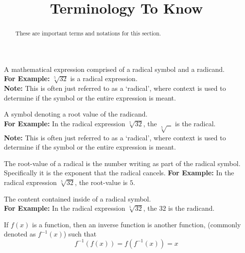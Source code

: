 \documentclass{ximeraXloud}
\title{Terminology To Know}
\begin{document}
\begin{abstract}
    These are important terms and notations for this section.
\end{abstract}
\maketitle

\begin{definition}
    A mathematical expression comprised of a radical symbol and a radicand. \\
    \textbf{For Example:} $\sqrt[5]{32}$ is a radical expression.\\
    \textbf{Note:} This is often just referred to as a `radical', where context is used to determine if the symbol or the entire expression is meant.
\end{definition} 

\begin{definition}
    A symbol denoting a root value of the radicand.\\
    \textbf{For Example:} In the radical expression $\sqrt[5]{32}$, the $\sqrt[5]{\text{     }}$ is the radical.\\
    \textbf{Note:} This is often just referred to as a `radical', where context is used to determine if the symbol or the entire expression is meant.
\end{definition} 

\begin{definition}
    The root-value of a radical is the number writing as part of the radical symbol. Specifically it is the exponent that the radical cancels.
    \textbf{For Example:} In the radical expression $\sqrt[5]{32}$, the root-value is $5$.
\end{definition} 

\begin{definition}[Radicand]
    The content contained inside of a radical symbol. \\
    \textbf{For Example:} In the radical expression $\sqrt[5]{32}$, the $32$ is the radicand.
\end{definition} 

\begin{definition}
    If $f(x)$ is a function, then an inverse function is another function, (commonly denoted as $f^{-1}(x)$) such that
    \[
        f^{-1}(f(x)) = f(f^{-1}(x)) = x
    \]
\end{definition} 
\end{document}
